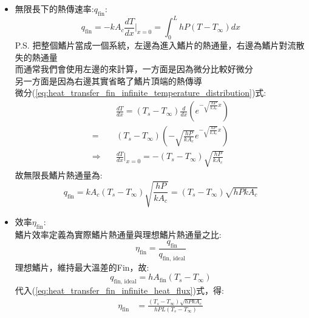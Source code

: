 \documentclass[../main.tex]{subfiles}
\begin{document}
\begin{itemize}
\begin{itemize}
\begin{itemize}
      故溫度分佈為:
      \begin{equation}
        T(x) = T_\infty + (T_s - T_\infty) e^{-\sqrt{\frac{hP}{kA_c}} x} \label{eq:heat_transfer_fin_infinite_temperature_distribution}
      \end{equation}
      \item 無限長下的熱傳速率:$q_\text{fin}$:
      \begin{equation}
        q_\text{fin} = -kA_c \frac{dT}{dx}\bigg|_{x=0} = \int_0^L hP(T-T_\infty) dx
      \end{equation}
      P.S. 把整個鰭片當成一個系統，左邊為進入鰭片的熱通量，右邊為鰭片對流散失的熱通量\\
      而通常我們會使用左邊的來計算，一方面是因為微分比較好微分\\
      另一方面是因為右邊其實省略了鰭片頂端的熱傳導\\
      微分(\ref{eq:heat_transfer_fin_infinite_temperature_distribution})式:
      \begin{align}
        & \frac{dT}{dx} = (T_s - T_\infty) \frac{d}{dx}\left(
          e^{-\sqrt{\frac{hP}{kA_c}} x}
        \right) \nonumber\\
        = & (T_s - T_\infty) \left(
          -\sqrt{\frac{hP}{kA_c}} e^{-\sqrt{\frac{hP}{kA_c}} x}
        \right) \nonumber\\
        \Rightarrow\quad& \frac{dT}{dx}\bigg|_{x=0} = -(T_s - T_\infty) \sqrt{\frac{hP}{kA_c}}
      \end{align}
      故無限長鰭片熱通量為:
      \begin{equation}
        q_\text{fin} = kA_c (T_s - T_\infty) \sqrt{\frac{hP}{kA_c}} =\boxed{ (T_s - T_\infty) \sqrt{hPkA_c}} \label{eq:heat_transfer_fin_infinite_heat_flux}
      \end{equation}
      \item 效率$\eta_\text{fin}$:\\
      鰭片效率定義為實際鰭片熱通量與理想鰭片熱通量之比:
      \begin{equation}
        \eta_\text{fin} = \frac{q_\text{fin}}{q_{\text{fin, ideal}}}
      \end{equation}
      理想鰭片，維持最大溫差的Fin，故:
      \begin{equation}
        q_{\text{fin, ideal}} = h A_\text{fin} (T_s - T_\infty)
      \end{equation} 
      代入(\ref{eq:heat_transfer_fin_infinite_heat_flux})式，得:
      \begin{align}
        \eta_\text{fin} &= \frac{(T_s - T_\infty) \sqrt{hPkA_c}}{h P L (T_s - T_\infty)} \nonumber\\

\end{align}
\end{itemize}
\end{itemize}
\end{itemize}
\end{document}
